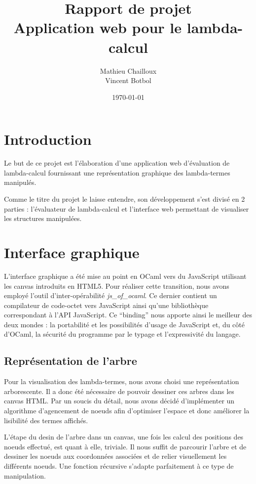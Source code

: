 \documentclass[11pt,a4paper]{report}
\title{Rapport de projet\\Application web pour le lambda-calcul}
\author{Mathieu Chailloux\\Vincent Botbol}
\date\today
\begin{document}
\maketitle

\chapter{Introduction}

Le but de ce projet est l'élaboration d'une application web d'évaluation de lambda-calcul fournissant une représentation graphique des lambda-termes manipulés.

Comme le titre du projet le laisse entendre, son développement s'est divisé en 2 parties : l'évaluateur de lambda-calcul et l'interface web permettant de visualiser les structures manipulées.

\chapter{Interface graphique}

L'interface graphique a été mise au point en OCaml vers du JavaScript
utilisant les canvas introduits en HTML5. Pour réaliser cette
transition, nous avons employé l'outil d'inter-opérabilité
\emph{js\_of\_ocaml}. Ce dernier contient un compilateur de code-octet
vers JavaScript ainsi qu'une bibliothèque correspondant à l'API
JavaScript. Ce ``binding'' nous apporte ainsi le meilleur des deux
mondes : la portabilité et les possibilités d'usage de JavaScript et,
du côté d'OCaml, la sécurité du programme par le typage et
l'expressivité du langage.

\section{Représentation de l'arbre}

Pour la visualisation des lambda-termes, nous avons choisi une
représentation arborescente. Il a donc été nécessaire de pouvoir
dessiner ces arbres dans les canvas HTML. Par un soucis du détail,
nous avons décidé d'implémenter un algorithme d'agencement de noeuds
afin d'optimiser l'espace et donc améliorer la lisibilité des termes
affichés. 

L'étape du desin de l'arbre dans un canvas, une fois les calcul des
positions des noeuds effectué, est quant à elle, triviale. Il nous
suffit de parcourir l'arbre et de dessiner les noeuds aux coordonnées
associées et de relier visuellement les différents noeuds. Une
fonction récursive s'adapte parfaitement à ce type de manipulation.
\end{document}

